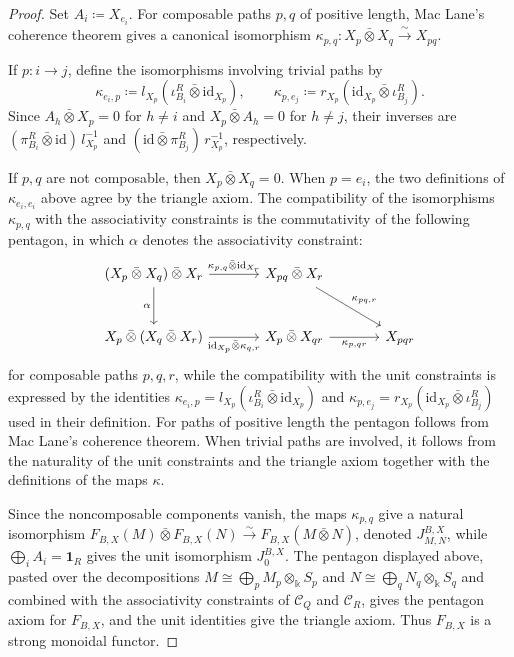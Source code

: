 \documentclass{amsart}
\newcommand{\id}{\mathrm{id}}
\newcommand{\btensor}{\mathbin{\bar{\otimes}}}
\theoremstyle{definition}
\theoremstyle{remark}
\numberwithin{equation}{section}
\begin{document}
\begin{proof}
Set $A_i\coloneqq X_{e_i}$.
For composable paths $p,q$ of positive length, Mac Lane's coherence theorem
\cite{ML1998}
gives a canonical isomorphism
$\kappa_{p,q}\colon X_p\btensor X_q\xrightarrow{\sim}X_{pq}$.

If
$p\colon i\to j$,
define the isomorphisms involving trivial paths by
\[
\kappa_{e_i,p}
\coloneqq
l_{X_p}
(\iota_{B_i}^R\btensor\id_{X_p}),
\qquad
\kappa_{p,e_j}
\coloneqq
r_{X_p}
(\id_{X_p}\btensor\iota_{B_j}^R).
\]
Since $A_h\btensor X_p=0$ for $h\neq i$ and $X_p\btensor A_h=0$ for
$h\neq j$, their inverses are
$(\pi_{B_i}^R\btensor\id)\,l_{X_p}^{-1}$ and
$(\id\btensor\pi_{B_j}^R)\,r_{X_p}^{-1}$, respectively.

If $p,q$ are not composable, then $X_p\btensor X_q=0$.
When $p=e_i$, the two definitions of $\kappa_{e_i,e_i}$ above agree  by the triangle axiom.
The compatibility of the isomorphisms $\kappa_{p,q}$ with the
associativity constraints is the commutativity of the following
pentagon, in which $\alpha$ denotes the associativity constraint:
\[
\begin{tikzcd}[column sep=large,row sep=large]
(X_p\btensor X_q)\btensor X_r
  \arrow[r,"\kappa_{p,q}\btensor\id_{X_r}"]
  \arrow[d,"\alpha"']
&
X_{pq}\btensor X_r
  \arrow[dr,"\kappa_{pq,r}"]\\
X_p\btensor(X_q\btensor X_r)
  \arrow[r,"\id_{X_p}\btensor\kappa_{q,r}"']
&
X_p\btensor X_{qr}
  \arrow[r,"\kappa_{p,qr}"']
&
X_{pqr}
\end{tikzcd}
\]
for composable paths $p,q,r$, while the compatibility with the unit
constraints is expressed by the identities
$\kappa_{e_i,p}=l_{X_p}(\iota^R_{B_i}\btensor\id_{X_p})$ and
$\kappa_{p,e_j}=r_{X_p}(\id_{X_p}\btensor\iota^R_{B_j})$ used in their
definition. For paths of positive length the pentagon follows from Mac
Lane's coherence theorem. When trivial paths are involved, it follows from
the naturality of the unit constraints and the triangle axiom together
with the definitions of the maps $\kappa$.

Since the noncomposable components vanish, the maps $\kappa_{p,q}$
give a natural isomorphism
$F_{B,X}(M)\btensor F_{B,X}(N)\xrightarrow{\sim}
F_{B,X}(M\btensor N)$, denoted $J^{B,X}_{M,N}$,
while $\bigoplus_iA_i=\mathbf1_R$ gives the unit isomorphism
$J_0^{B,X}$.
The pentagon displayed above, pasted over the decompositions
$M\cong\bigoplus_pM_p\otimes_{\Bbbk}S_p$ and
$N\cong\bigoplus_qN_q\otimes_{\Bbbk}S_q$ and combined with the associativity
constraints of $\mathcal C_Q$ and $\mathcal C_R$, gives the pentagon axiom
for $F_{B,X}$, and the unit identities give the triangle axiom. Thus
$F_{B,X}$ is a strong monoidal functor.


\end{proof}
\end{document}

